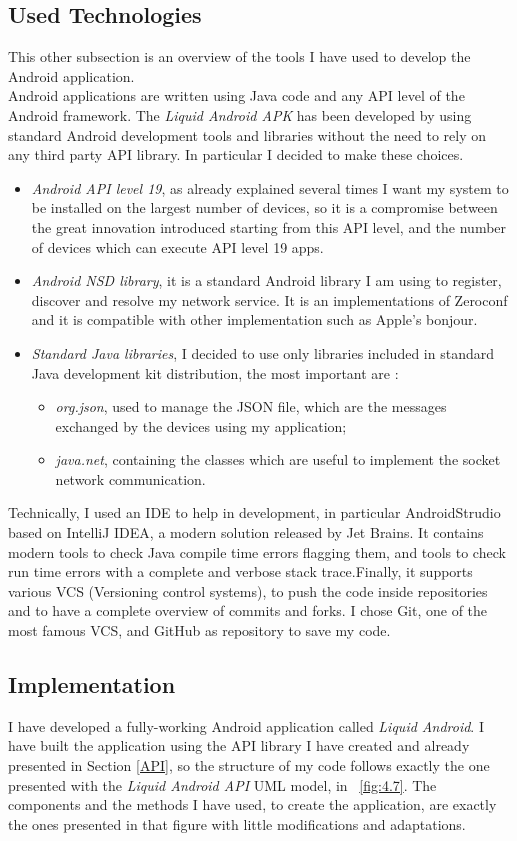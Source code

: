\subsection{Used Technologies}
This other subsection is an overview of the tools I have used to develop the
Android application.\\
Android applications are written using Java code and any API level of the Android framework. The \textit{Liquid Android APK} has been developed by using standard Android development tools and libraries without the need to rely on any third party API library. In particular I decided to make these choices.
\begin{itemize}
	\item \textit{Android API level 19}, as already explained several times I want my system to be installed on the largest number of devices, so it is a compromise between the great innovation introduced starting from this API level, and the number of devices which can execute API level 19 apps.
	\item \textit{Android NSD library}, it is a standard Android library I am using to register, discover and resolve my network service. It is an implementations of Zeroconf and it is compatible with other implementation such as Apple's bonjour.
	\item \textit{Standard Java libraries}, I decided to use only libraries included in standard Java development kit distribution, the most important are :
	\begin{itemize}
		\item \textit{org.json}, used to manage the JSON file, which are the messages exchanged by the devices using my application;
		\item \textit{java.net}, containing the classes which are useful to implement the socket network communication.
	\end{itemize}	
\end{itemize}
Technically, I used an IDE to help in development, in particular AndroidStrudio based on IntelliJ IDEA, a
modern solution released by Jet Brains. It contains modern tools to check Java
compile time errors flagging them, and tools to check run time errors with a
complete and verbose stack trace.Finally,
it supports various VCS (Versioning control systems), to push the code inside
repositories and to have a complete overview of commits and forks. I chose Git,
one of the most famous VCS, and GitHub as repository to save my code.
\subsection{Implementation}
I have developed a fully-working Android application called \textit{Liquid Android}. I have built the application using the API library I have created and already presented in Section \ref{API}, so the structure of my code follows exactly the one presented with the \textit{Liquid Android API} UML model, in \figurename~\ref{fig:4.7}. The components and the methods I have used, to create the application, are exactly the ones presented in that figure with little modifications and adaptations.
